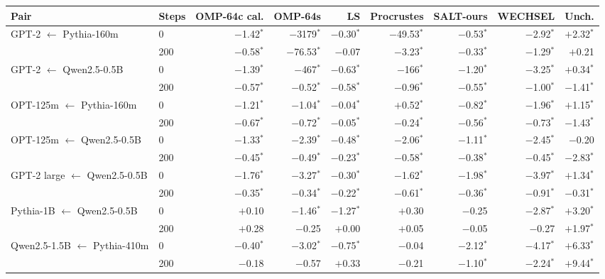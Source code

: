 \begin{tabular}{llrrrrrrr}
\toprule
Pair & Steps & OMP-64c cal. & OMP-64s & LS & Procrustes & SALT-ours & WECHSEL & Unch. \\
\midrule
GPT-2 $\leftarrow$ Pythia-160m & 0 & $-$1.42$^{*}$ & $-$3179$^{*}$ & $-$0.30$^{*}$ & $-$49.53$^{*}$ & $-$0.53$^{*}$ & $-$2.92$^{*}$ & $+$2.32$^{*}$ \\
 & 200 & $-$0.58$^{*}$ & $-$76.53$^{*}$ & $-$0.07 & $-$3.23$^{*}$ & $-$0.33$^{*}$ & $-$1.29$^{*}$ & $+$0.21 \\
\addlinespace
GPT-2 $\leftarrow$ Qwen2.5-0.5B & 0 & $-$1.39$^{*}$ & $-$467$^{*}$ & $-$0.63$^{*}$ & $-$166$^{*}$ & $-$1.20$^{*}$ & $-$3.25$^{*}$ & $+$0.34$^{*}$ \\
 & 200 & $-$0.57$^{*}$ & $-$0.52$^{*}$ & $-$0.58$^{*}$ & $-$0.96$^{*}$ & $-$0.55$^{*}$ & $-$1.00$^{*}$ & $-$1.41$^{*}$ \\
\addlinespace
OPT-125m $\leftarrow$ Pythia-160m & 0 & $-$1.21$^{*}$ & $-$1.04$^{*}$ & $-$0.04$^{*}$ & $+$0.52$^{*}$ & $-$0.82$^{*}$ & $-$1.96$^{*}$ & $+$1.15$^{*}$ \\
 & 200 & $-$0.67$^{*}$ & $-$0.72$^{*}$ & $-$0.05$^{*}$ & $-$0.24$^{*}$ & $-$0.56$^{*}$ & $-$0.73$^{*}$ & $-$1.43$^{*}$ \\
\addlinespace
OPT-125m $\leftarrow$ Qwen2.5-0.5B & 0 & $-$1.33$^{*}$ & $-$2.39$^{*}$ & $-$0.48$^{*}$ & $-$2.06$^{*}$ & $-$1.11$^{*}$ & $-$2.45$^{*}$ & $-$0.20 \\
 & 200 & $-$0.45$^{*}$ & $-$0.49$^{*}$ & $-$0.23$^{*}$ & $-$0.58$^{*}$ & $-$0.38$^{*}$ & $-$0.45$^{*}$ & $-$2.83$^{*}$ \\
\addlinespace
GPT-2 large $\leftarrow$ Qwen2.5-0.5B & 0 & $-$1.76$^{*}$ & $-$3.27$^{*}$ & $-$0.30$^{*}$ & $-$1.62$^{*}$ & $-$1.98$^{*}$ & $-$3.97$^{*}$ & $+$1.34$^{*}$ \\
 & 200 & $-$0.35$^{*}$ & $-$0.34$^{*}$ & $-$0.22$^{*}$ & $-$0.61$^{*}$ & $-$0.36$^{*}$ & $-$0.91$^{*}$ & $-$0.31$^{*}$ \\
\addlinespace
Pythia-1B $\leftarrow$ Qwen2.5-0.5B & 0 & $+$0.10 & $-$1.46$^{*}$ & $-$1.27$^{*}$ & $+$0.30 & $-$0.25 & $-$2.87$^{*}$ & $+$3.20$^{*}$ \\
 & 200 & $+$0.28 & $-$0.25 & $+$0.00 & $+$0.05 & $-$0.05 & $-$0.27 & $+$1.97$^{*}$ \\
\addlinespace
Qwen2.5-1.5B $\leftarrow$ Pythia-410m & 0 & $-$0.40$^{*}$ & $-$3.02$^{*}$ & $-$0.75$^{*}$ & $-$0.04 & $-$2.12$^{*}$ & $-$4.17$^{*}$ & $+$6.33$^{*}$ \\
 & 200 & $-$0.18 & $-$0.57 & $+$0.33 & $-$0.21 & $-$1.10$^{*}$ & $-$2.24$^{*}$ & $+$9.44$^{*}$ \\
\bottomrule
\end{tabular}
